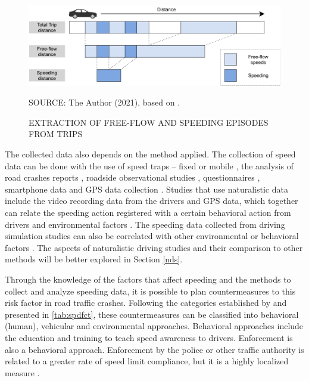 \begin{figure}[!htbp]
    \centering\footnotesize
    \captionsetup{font=footnotesize}
    \caption{EXTRACTION OF FREE-FLOW AND SPEEDING EPISODES FROM TRIPS}
    \includegraphics{fig/richards.pdf}
    \label{fig:ff}
    \par SOURCE: The Author (2021), based on \textcite{Richard2013}.
\end{figure}

The collected data also depends on the method applied. The collection of speed data can be done with the use of speed traps – fixed or mobile \cite{Hidalgo-Solorzano2020, WHO2008}, the analysis of road crashes reports \cite{Watson2015}, roadside observational studies \cite{Shinar2017}, questionnaires \cite{Dinh2013}, smartphone data \cite{Warren2019} and GPS data collection \cite{Moreno2013, Wang2018}. Studies that use naturalistic data include the video recording data from the drivers and GPS data, which together can relate the speeding action registered with a certain behavioral action from drivers \cite{Bastos2020a} and environmental factors \cite{Moreno2013}. The speeding data collected from driving simulation studies can also be correlated with other environmental or behavioral factors \cite{Yadav2020}. The aspects of naturalistic driving studies and their comparison to other methods will be better explored in Section \ref{nds}. 

Through the knowledge of the factors that affect speeding and the methods to collect and analyze speeding data, it is possible to plan countermeasures to this risk factor in road traffic crashes. Following the categories established by \textcite{Haddon1980} and presented in \autoref{tab:spdfct}, these countermeasures can be classified into behavioral (human), vehicular and environmental approaches. Behavioral approaches include the education and training to teach speed awareness to drivers. Enforcement is also a behavioral approach. Enforcement by the police or other traffic authority is related to a greater rate of speed limit compliance, but it is a highly localized measure \cite{Shinar2017}. 


